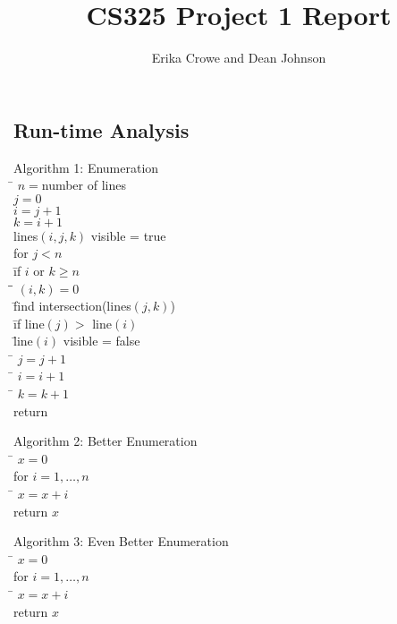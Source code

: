 \documentclass{article}
\title{CS325 Project 1 Report}
\author{Erika Crowe and Dean Johnson}
\begin{document}
\maketitle


\subsection*{Run-time Analysis}


\begin{tabbing}
  {\sc Algorithm 1: Enumeration}\\
  \qquad \= $n = $number of lines \\
  \> $j = 0$ \\
  \> $i = j+1$\\
  \> $k = i+1$\\
  \> lines$(i,j,k)$ visible = true\\
  \> for $j < n$\\
  \> \qquad \= if $i$ or $k \geq n$\\
  \> \qquad \= \qquad \= $(i,k) = 0$\\
  \> \qquad \= find intersection(lines$(j,k)$)\\
  \> \qquad \= if line$(j) >$ line$(i)$\\
  \> \qquad \= line$(i)$ visible = false\\
  \> \qquad \= $j = j+1$\\
  \> \qquad \= $i = i+1$\\
  \> \qquad \= $k = k+1$\\
  \> return
\end{tabbing}

\begin{tabbing}
  {\sc Algorithm 2: Better Enumeration}\\
  \qquad \= $x = 0$ \\
  \> for $i = 1, \ldots, n$\\
  \> \qquad \= $x = x+i$\\

  \> return $x$
\end{tabbing}

\begin{tabbing}
  {\sc Algorithm 3: Even Better Enumeration}\\
  \qquad \= $x = 0$ \\
  \> for $i = 1, \ldots, n$\\
  \> \qquad \= $x = x+i$\\
  \> return $x$
\end{tabbing}
\end{document}
